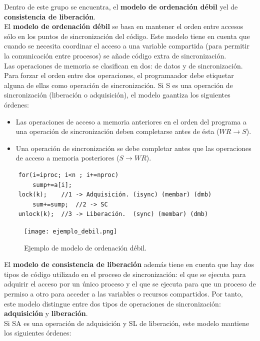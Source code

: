 \documentclass[12pt,spanish]{article}
\begin{document}
Dentro de este grupo se encuentra, el \textbf{modelo de ordenación débil} yel de \textbf{consistencia de liberación}.\\

El \textbf{modelo de ordenación débil} se basa en mantener el orden entre accesos sólo en los puntos de sincronización del código. Este modelo tiene en cuenta que cuando se necesita coordinar el acceso  a una variable compartida (para permitir la comunicación entre procesos) se añade código extra de sincronización.\\

Las operaciones de memoria se clasifican en dos: de datos y de sincronización. Para forzar el orden entre dos operaciones, el programaador debe etiquetar alguna de ellas como operación de sincronización. Si S es una operación de sincronización (liberación o adquisición), el modelo gaantiza los siguientes órdenes:
\begin{itemize}
	\item Las operaciones de acceso a memoria anteriores en el orden del programa a una operación de sincronización deben completarse antes de ésta ($WR \rightarrow S$).
	\item Una operación de sincronización se debe completar antes que las operaciones de acceso a memoria posteriores ($S \rightarrow WR$).
\end{itemize}

\begin{verbatim}
	for(i=iproc; i<n ; i+=nproc)
		sump+=a[i];
	lock(k);	//1 -> Adquisición. (isync) (membar) (dmb)
		sum+=sump;	//2 -> SC
	unlock(k);	//3 -> Liberación.	(sync) (membar) (dmb)
\end{verbatim}
\begin{figure}[H]
\centering
\texttt{[image: ejemplo\_debil.png]}
\caption{Ejemplo de modelo de ordenación débil.}
\end{figure}

El \textbf{modelo de consistencia de liberación} además tiene en cuenta que hay dos tipos de código utilizado en el proceso de sincronización: el que se ejecuta para adquirir el acceso por un único proceso y el que se ejecuta para que un proceso de permiso a otro para acceder a las variables o recursos compartidos. Por tanto, este modelo distingue entre dos tipos de operaciones de sincronización: \textbf{adquisición} y \textbf{liberación}.\\

Si SA es una operación de adquisición y SL de liberación, este modelo mantiene los siguientes órdenes:
\end{document}
